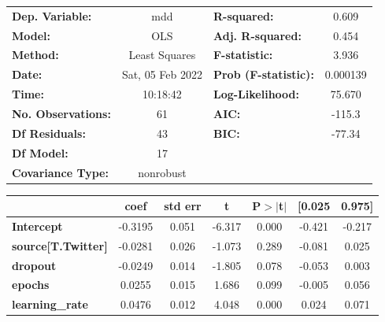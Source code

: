 \begin{center}
\begin{tabular}{lclc}
\toprule
\textbf{Dep. Variable:}                   &       mdd        & \textbf{  R-squared:         } &     0.609   \\
\textbf{Model:}                           &       OLS        & \textbf{  Adj. R-squared:    } &     0.454   \\
\textbf{Method:}                          &  Least Squares   & \textbf{  F-statistic:       } &     3.936   \\
\textbf{Date:}                            & Sat, 05 Feb 2022 & \textbf{  Prob (F-statistic):} &  0.000139   \\
\textbf{Time:}                            &     10:18:42     & \textbf{  Log-Likelihood:    } &    75.670   \\
\textbf{No. Observations:}                &          61      & \textbf{  AIC:               } &    -115.3   \\
\textbf{Df Residuals:}                    &          43      & \textbf{  BIC:               } &    -77.34   \\
\textbf{Df Model:}                        &          17      & \textbf{                     } &             \\
\textbf{Covariance Type:}                 &    nonrobust     & \textbf{                     } &             \\
\bottomrule
\end{tabular}
\begin{tabular}{lcccccc}
                                          & \textbf{coef} & \textbf{std err} & \textbf{t} & \textbf{P$> |$t$|$} & \textbf{[0.025} & \textbf{0.975]}  \\
\midrule
\textbf{Intercept}                        &      -0.3195  &        0.051     &    -6.317  &         0.000        &       -0.421    &       -0.217     \\
\textbf{source[T.Twitter]}                &      -0.0281  &        0.026     &    -1.073  &         0.289        &       -0.081    &        0.025     \\
\textbf{dropout}                          &      -0.0249  &        0.014     &    -1.805  &         0.078        &       -0.053    &        0.003     \\
\textbf{epochs}                           &       0.0255  &        0.015     &     1.686  &         0.099        &       -0.005    &        0.056     \\
\textbf{learning\_rate}                   &       0.0476  &        0.012     &     4.048  &         0.000        &        0.024    &        0.071     \\

\end{tabular}
\end{center}
